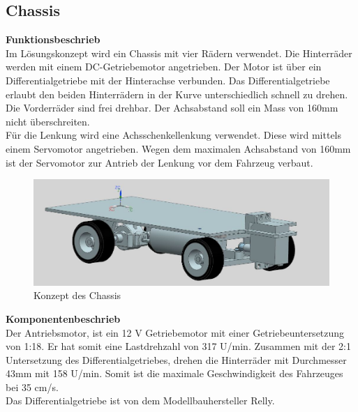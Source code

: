\subsection{Chassis}

\textbf{Funktionsbeschrieb}
\\[0.2cm]
Im Lösungskonzept wird ein Chassis mit vier Rädern verwendet. Die Hinterräder werden mit einem DC-Getriebemotor angetrieben. Der Motor ist über ein Differentialgetriebe mit der Hinterachse verbunden. Das Differentialgetriebe erlaubt den beiden Hinterrädern in der Kurve unterschiedlich schnell zu drehen. Die Vorderräder sind frei drehbar. Der Achsabstand soll ein Mass von 160mm nicht überschreiten.\\
Für die Lenkung wird eine Achsschenkellenkung verwendet. Diese wird mittels einem Servomotor angetrieben. Wegen dem maximalen Achsabstand von 160mm ist der Servomotor zur Antrieb der Lenkung vor dem Fahrzeug verbaut.
\begin{figure}[H]%
\centering
\includegraphics[width=1\textwidth]{03_Loesungskonzept/pictures/Chassis_2.JPG}
\caption{Konzept des Chassis}
\label{fig:activityRoute}
\end{figure}
\textbf{Komponentenbeschrieb}
\\[0.2cm]
Der Antriebsmotor, ist ein 12 V Getriebemotor mit einer Getriebeuntersetzung von 1:18. Er hat somit eine Lastdrehzahl von 317 U/min. Zusammen mit der 2:1 Untersetzung des Differentialgetriebes, drehen die Hinterräder mit Durchmesser 43mm mit 158 U/min. Somit ist die maximale Geschwindigkeit des Fahrzeuges bei 35 cm/s.\\
Das Differentialgetriebe ist von dem Modellbauhersteller Relly.
